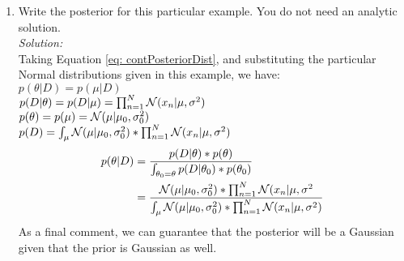 \documentclass{../amsml}
\begin{document}
\begin{problem}
\begin{enumerate}
		
	\item Write the posterior for this particular example. You do not need an analytic solution. \\
		\emph{Solution: }  \\
			Taking Equation \ref{eq: contPosteriorDist}, and substituting the particular Normal distributions given in this example, we have: \\
				$p( \theta | D ) = p(\mu | D)$ \\
				$p( D | \theta ) = p(D | \mu) = \prod_{n=1}^{N} \mathcal{N}(x_n | \mu , \sigma^2)$  \\ 
				$p(\theta) = p(\mu) = \mathcal{N}(\mu | \mu_0 , \sigma_0^2)$  \\
				$p(D) = \int_{\mu }\mathcal{N}(\mu | \mu_0 , \sigma_0^2) * \prod_{n=1}^{N} \mathcal{N}(x_n | \mu , \sigma^2) $ \\ 
			\begin{equation}
				\begin{split}
					p( \theta | D ) & = \frac{p( D | \theta ) * p( \theta)}{\int_{\theta_0 = \theta } p(D | \theta_0) * p(\theta_0)} \\
					& = \frac{ \mathcal{N}(\mu | \mu_0 , \sigma_0^2) * \prod_{n=1}^{N} \mathcal{N}(x_n | \mu , \sigma^2}{\int_{\mu }\mathcal{N}(\mu | \mu_0 , \sigma_0^2) * \prod_{n=1}^{N} \mathcal{N}(x_n | \mu , \sigma^2)}
				\end{split}
			\end{equation}
			As a final comment, we can guarantee that the posterior will be a Gaussian given that the prior is Gaussian as well. 

\end{enumerate}
\end{problem}

\end{document}
